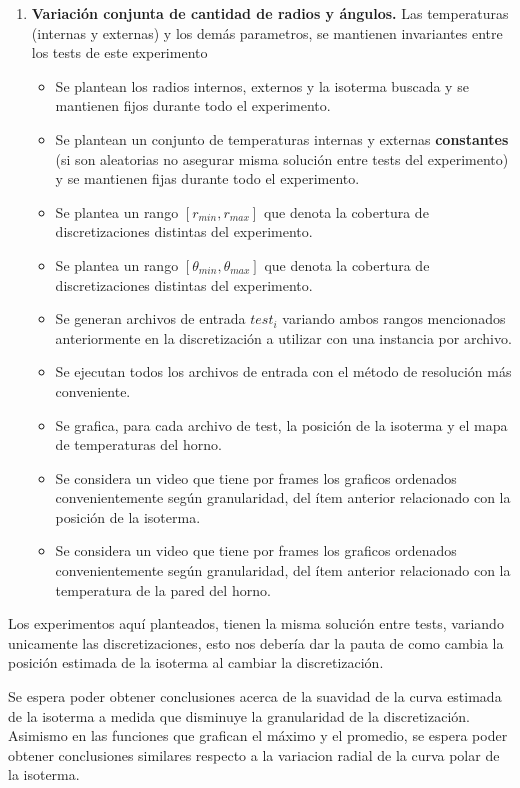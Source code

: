 \begin{enumerate}
    \item \textbf{Variación conjunta de cantidad de radios y ángulos.} Las temperaturas (internas y externas) y los demás parametros, se mantienen invariantes entre los tests de este experimento\begin{itemize}
        \item Se plantean los radios internos, externos y la isoterma buscada y se mantienen fijos durante todo el experimento.
        \item Se plantean un conjunto de temperaturas internas y externas \textbf{constantes} (si son aleatorias no asegurar misma solución entre tests del experimento) y se mantienen fijas durante todo el experimento.
        \item Se plantea un rango $[r_{min}, r_{max}]$ que denota la cobertura de discretizaciones distintas del experimento.        
        \item Se plantea un rango $[\theta_{min}, \theta_{max}]$ que denota la cobertura de discretizaciones distintas del experimento.
        \item Se generan archivos de entrada $test_i$ variando ambos rangos mencionados anteriormente en la discretización a utilizar con una instancia por archivo.
        \item Se ejecutan todos los archivos de entrada con el método de resolución más conveniente.
        \item Se grafica, para cada archivo de test, la posición de la isoterma y el mapa de temperaturas del horno.
        \item Se considera un video que tiene por frames los graficos ordenados convenientemente según granularidad, del ítem anterior relacionado con la posición de la isoterma.
        \item Se considera un video que tiene por frames los graficos ordenados convenientemente según granularidad, del ítem anterior relacionado con la temperatura de la pared del horno.
    \end{itemize}    
\end{enumerate}

Los experimentos aquí planteados, tienen la misma solución entre tests, variando unicamente las discretizaciones, esto nos debería dar la pauta de como cambia la posición estimada de la isoterma al cambiar la discretización.

Se espera poder obtener conclusiones acerca de la suavidad de la curva estimada de la isoterma a medida que disminuye la granularidad de la discretización. Asimismo en las funciones que grafican el máximo y el promedio, se espera poder obtener conclusiones similares respecto a la variacion radial de la curva polar de la isoterma.\\

